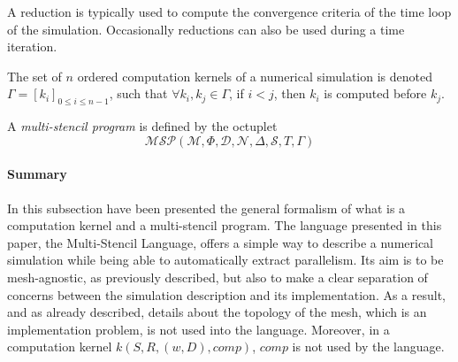 
A reduction is typically used to compute the convergence criteria of the time loop of the simulation. Occasionally reductions can also be used during a time iteration.


\begin{mydef}
The set of $n$ ordered computation kernels of a numerical simulation is denoted $\Gamma = [k_i]_{0 \leq i \leq n-1}$, such that $\forall k_i,k_j \in \Gamma$, if $i < j$, then $k_i$ is computed before $k_j$.
\end{mydef}

\begin{mydef}
A \textit{multi-stencil program} is defined by the octuplet 
\begin{equation*}
\mathcal{MSP}(\mathcal{M},\Phi,\mathcal{D},\mathcal{N},\Delta, \mathcal{S},T,\Gamma)
\end{equation*}
\end{mydef}

\paragraph{\textbf{Summary}} In this subsection have been presented the general formalism of what is a computation kernel and a multi-stencil program. The language presented in this paper, the Multi-Stencil Language, offers a simple way to describe a numerical simulation while being able to automatically extract parallelism. Its aim is to be mesh-agnostic, as previously described, but also to make a clear separation of concerns between the simulation description and its implementation. As a result, and as already described, details about the topology of the mesh, which is an implementation problem, is not used into the language. Moreover, in a computation kernel $k(S,R,(w,D),comp)$, $comp$ is not used by the language.

